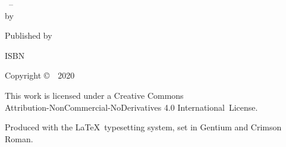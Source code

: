 \cleartoverso
\thispagestyle{empty}

{\copyrightsize
\centering
\setlength{\parindent}{0pt}%
\setlength{\parskip}{0.8\baselineskip}%

\thetitle\ -- \thesubtitle\\
by \theauthor

Published by \thePublisher

ISBN \theISBN

Copyright \copyright\ \thePublisher\ 2020

\vfill

{\footnotesize

This work is licensed under a Creative Commons\\
Attribution-NonCommercial-NoDerivatives 4.0 International~License.

Produced with the \LaTeX\ typesetting system, set in Gentium and Crimson Roman.

\theEditionInfo

}}
